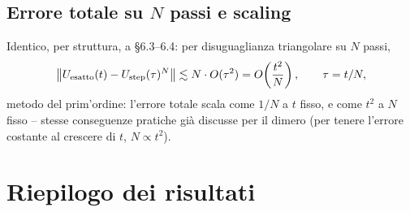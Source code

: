 \documentclass[11pt,a4paper]{article}
\begin{document}
\subsection{Errore totale su $N$ passi e scaling}

Identico, per struttura, a \texttt{} \S6.3--6.4: per disuguaglianza triangolare su $N$ passi,
\begin{equation}
\big\|U_{\rm esatto}(t)-U_{\rm step}(\tau)^N\big\| \lesssim N\cdot O(\tau^2) = O\!\left(\frac{t^2}{N}\right), \qquad \tau=t/N,
\end{equation}
metodo del prim'ordine: l'errore totale scala come $1/N$ a $t$ fisso, e come $t^2$ a $N$ fisso -- stesse conseguenze pratiche già discusse per il dimero (per tenere l'errore costante al crescere di $t$, $N\propto t^2$).

\section{Riepilogo dei risultati}
\end{document}
